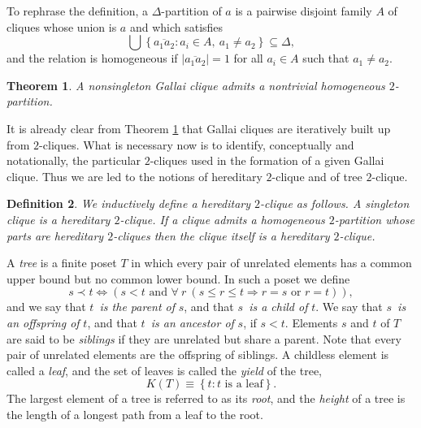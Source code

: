 \documentclass[12pt]{amsart}
\newtheorem{theorem}{Theorem}[section]
\theoremstyle{plain}
\newtheorem{definition}[theorem]{Definition}
\numberwithin{equation}{section}
\begin{document}
To rephrase the definition, a $\Delta$-partition of $a$ is a pairwise disjoint
family $A$ of cliques whose union is $a$ and which satisfies
\begin{displaymath}
    \bigcup\left\{  \overline{a_{1}a_{2}}:a_{i}\in A,\ a_{1}\neq a_{2}\right\}
    \subseteq\Delta,
\end{displaymath}
and the relation is homogeneous if $\left\vert \overline{a_{1}a_{2}}\right\vert
=1$ for all $a_{i}\in A$ such that $a_{1}\neq a_{2}$.

\begin{theorem}
\label{Thm:H2C=Gall}A nonsingleton Gallai clique admits a nontrivial
homogeneous $2$-partition.
\end{theorem}

It is already clear from Theorem \ref{Thm:H2C=Gall} that Gallai cliques are
iteratively built up from $2$-cliques. What is necessary now is to identify,
conceptually and notationally, the particular $2$-cliques used in the
formation of a given Gallai clique. Thus we are led to the notions of
hereditary $2$-clique and of tree $2$-clique.

\begin{definition}
\label{7}We inductively define a \emph{hereditary }$2$\emph{-clique} as
follows. A singleton clique is a hereditary $2$-clique. If a clique admits a
homogeneous $2$-partition whose parts are hereditary $2$-cliques then the
clique itself is a hereditary $2$-clique.
\end{definition}

A \emph{tree} is a finite poset $T$ in which every pair of unrelated elements
has a common upper bound but no common lower bound. In such a poset we define
\begin{displaymath}
    s\prec t\Longleftrightarrow\left(  s<t\text{ and }\forall\ r\ \left(  s\leq
    r\leq t\Longrightarrow r=s\text{ or }r=t\right)  \right)  ,
\end{displaymath}
and we say that $t$\emph{\ is the parent of }$s$, and that $s$\emph{\ is a
child of }$t$. We say that $s$\emph{\ is an offspring of }$t$, and that
$t$\emph{\ is an ancestor of }$s$, if $s<t$. Elements $s$ and $t$ of $T$ are
said to be \emph{siblings} if they are unrelated but share a parent. Note that
every pair of unrelated elements are the offspring of siblings. A childless
element is called a \emph{leaf}, and the set of leaves is called the
\emph{yield} of the tree,
\begin{displaymath}
    K\left(  T\right)  \equiv\left\{  t:t\text{ is a leaf}\right\}  .
\end{displaymath}
The largest element of a tree is referred to as its \emph{root}, and the
\emph{height} of a tree is the length of a longest path from a leaf to the root.
\end{document}
